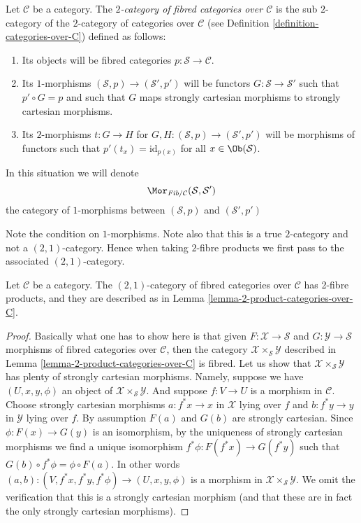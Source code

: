 \begin{definition}
\label{definition-fibred-categories-over-C}
Let $\mathcal{C}$ be a category.
The {\it $2$-category of fibred categories over $\mathcal{C}$}
is the sub $2$-category of the $2$-category of categories
over $\mathcal{C}$ (see Definition \ref{definition-categories-over-C})
defined as follows:
\begin{enumerate}
\item Its objects will be fibred categories
$p : \mathcal{S} \to \mathcal{C}$.
\item Its $1$-morphisms $(\mathcal{S}, p) \to (\mathcal{S}', p')$
will be functors $G : \mathcal{S} \to \mathcal{S}'$ such that
$p' \circ G = p$ and such that $G$ maps strongly cartesian
morphisms to strongly cartesian morphisms.
\item Its $2$-morphisms $t : G \to H$ for
$G, H : (\mathcal{S}, p) \to (\mathcal{S}', p')$
will be morphisms of functors
such that $p'(t_x) = \text{id}_{p(x)}$
for all $x \in \Ob(\mathcal{S})$.
\end{enumerate}
In this situation we will denote
$$
\Mor_{\textit{Fib}/\mathcal{C}}(\mathcal{S}, \mathcal{S}')
$$
the category of $1$-morphisms between
$(\mathcal{S}, p)$ and $(\mathcal{S}', p')$
\end{definition}

\noindent
Note the condition on $1$-morphisms.
Note also that this is a true $2$-category and
not a $(2, 1)$-category. Hence when taking $2$-fibre
products we first pass to the associated $(2, 1)$-category.

\begin{lemma}
\label{lemma-2-product-fibred-categories-over-C}
Let $\mathcal{C}$ be a category.
The $(2, 1)$-category of fibred categories
over $\mathcal{C}$ has 2-fibre products, and
they are described as in
Lemma \ref{lemma-2-product-categories-over-C}.
\end{lemma}

\begin{proof}
Basically what one has to show here is that given
$F : \mathcal{X} \to \mathcal{S}$ and
$G : \mathcal{Y} \to \mathcal{S}$ morphisms of fibred
categories over $\mathcal{C}$, then the category
$\mathcal{X} \times_\mathcal{S} \mathcal{Y}$
described in Lemma \ref{lemma-2-product-categories-over-C} is fibred.
Let us show that $\mathcal{X} \times_\mathcal{S} \mathcal{Y}$
has plenty of strongly cartesian morphisms.
Namely, suppose we have $(U, x, y, \phi)$ an object of
$\mathcal{X} \times_\mathcal{S} \mathcal{Y}$.
And suppose $f : V \to U$ is a morphism in $\mathcal{C}$.
Choose strongly cartesian morphisms $a : f^*x \to x$ in $\mathcal{X}$
lying over $f$ and $b : f^*y \to y$ in $\mathcal{Y}$ lying over $f$.
By assumption $F(a)$ and $G(b)$ are strongly cartesian.
Since $\phi : F(x) \to G(y)$ is an isomorphism, by the uniqueness
of strongly cartesian morphisms we find a unique isomorphism
$f^*\phi : F(f^*x) \to G(f^*y)$ such that
$G(b) \circ f^*\phi = \phi \circ F(a)$. In other words
$(a, b) : (V, f^*x, f^*y, f^*\phi) \to (U, x, y, \phi)$
is a morphism in $\mathcal{X} \times_\mathcal{S} \mathcal{Y}$.
We omit the verification that this is a strongly cartesian morphism
(and that these are in fact the only strongly cartesian morphisms).
\end{proof}

